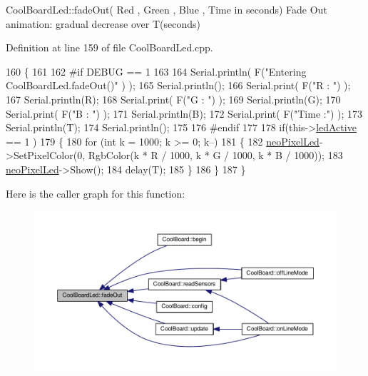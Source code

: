 Cool\+Board\+Led\+::fade\+Out( Red , Green , Blue , Time in seconds) Fade Out animation\+: gradual decrease over T(seconds) 

Definition at line 159 of file Cool\+Board\+Led.\+cpp.


\begin{DoxyCode}
160 \{
161 
162 \textcolor{preprocessor}{#if DEBUG == 1 }
163 
164     Serial.println( F(\textcolor{stringliteral}{"Entering CoolBoardLed.fadeOut()"} ) );
165     Serial.println();
166     Serial.print( F(\textcolor{stringliteral}{"R : "}) );
167     Serial.println(R);
168     Serial.print( F(\textcolor{stringliteral}{"G : "}) );
169     Serial.println(G);
170     Serial.print( F(\textcolor{stringliteral}{"B : "}) );
171     Serial.println(B);
172     Serial.print( F(\textcolor{stringliteral}{"Time :"}) );
173     Serial.println(T);
174     Serial.println();
175 
176 \textcolor{preprocessor}{#endif  }
177 
178     \textcolor{keywordflow}{if}(this->\hyperlink{class_cool_board_led_aadd04d2ecf123247718d77f42fba7f08}{ledActive} == 1 )
179     \{
180         \textcolor{keywordflow}{for} (\textcolor{keywordtype}{int} k = 1000; k >= 0; k--) 
181         \{
182             \hyperlink{class_cool_board_led_ac2c13fa462a010cd9242bf297c013923}{neoPixelLed}->SetPixelColor(0, RgbColor(k * R / 1000, k * G / 1000, k * B / 1000));
183             \hyperlink{class_cool_board_led_ac2c13fa462a010cd9242bf297c013923}{neoPixelLed}->Show();
184             delay(T);
185         \}
186     \}
187 \}
\end{DoxyCode}
Here is the caller graph for this function\+:\nopagebreak
\begin{figure}[H]
\begin{center}
\leavevmode
\includegraphics[width=350pt]{de/dc0/class_cool_board_led_a93d545679237e8cc858324367149775c_icgraph}
\end{center}
\end{figure}
\mbox{\label{class_cool_board_led_a8ed3053a36f0ed4a131f43b5b17efb61}} 
